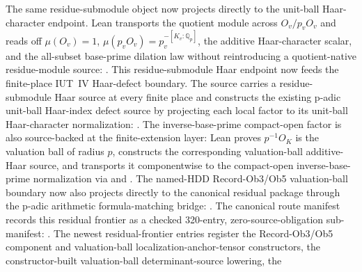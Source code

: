 \begin{proposition}
  The same residue-submodule object now projects directly to the unit-ball
  Haar-character endpoint.  Lean transports the quotient module across
  \(O_v/p_vO_v\) and reads off \(\mu(O_v)=1\),
  \(\mu(p_vO_v)=p_v^{-[K_v:\mathbb Q_p]}\), the additive Haar-character
  scalar, and the all-subset base-prime dilation law without reintroducing a
  quotient-native residue-module source:
  .
  This residue-submodule Haar endpoint now feeds the finite-place IUT~IV
  Haar-defect boundary.  The source
  carries a residue-submodule Haar source at every finite place and constructs
  the existing p-adic unit-ball Haar-index defect source by projecting each
  local factor to its unit-ball Haar-character normalization:
  .
  The inverse-base-prime compact-open factor is also source-backed at the
  finite-extension layer: Lean proves \(p^{-1}O_K\) is the valuation ball of
  radius \(p\), constructs the corresponding valuation-ball additive-Haar
  source, and transports it componentwise to the compact-open
  inverse-base-prime normalization via
  and
  .
  The named-HDD Record-Ob3/Ob5 valuation-ball boundary now also projects
  directly to the canonical residual package through the p-adic arithmetic
  formula-matching bridge:
  .
  The canonical route manifest records this residual frontier as a checked
  320-entry, zero-source-obligation sub-manifest:
  .
  The newest residual-frontier entries register the Record-Ob3/Ob5
  component and valuation-ball localization-anchor-tensor constructors, the
  constructor-built valuation-ball determinant-source lowering, the

\end{proposition}
